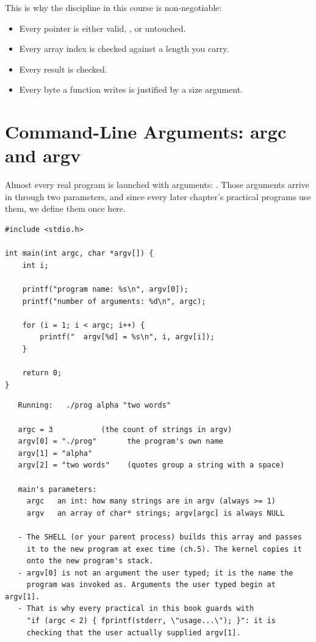 This is why the discipline in this course is non-negotiable:

\begin{itemize}
  \item Every pointer is either valid, , or untouched.
  \item Every array index is checked against a length you carry.
  \item Every  result is checked.
  \item Every byte a function writes is justified by a size argument.
\end{itemize}

\section{Command-Line Arguments: argc and argv}

Almost every real program is launched with arguments: . Those arguments arrive in  through two
parameters, and since every later chapter's practical programs use
them, we define them once here.

\begin{lstlisting}[caption={main receives its command line as argc and argv.}]
#include <stdio.h>

int main(int argc, char *argv[]) {
    int i;

    printf("program name: %s\n", argv[0]);
    printf("number of arguments: %d\n", argc);

    for (i = 1; i < argc; i++) {
        printf("  argv[%d] = %s\n", i, argv[i]);
    }

    return 0;
}
\end{lstlisting}

\begin{verbatim}
   Running:   ./prog alpha "two words"

   argc = 3           (the count of strings in argv)
   argv[0] = "./prog"       the program's own name
   argv[1] = "alpha"
   argv[2] = "two words"    (quotes group a string with a space)

   main's parameters:
     argc   an int: how many strings are in argv (always >= 1)
     argv   an array of char* strings; argv[argc] is always NULL

   - The SHELL (or your parent process) builds this array and passes
     it to the new program at exec time (ch.5). The kernel copies it
     onto the new program's stack.
   - argv[0] is not an argument the user typed; it is the name the
     program was invoked as. Arguments the user typed begin at argv[1].
   - That is why every practical in this book guards with
     "if (argc < 2) { fprintf(stderr, \"usage...\"); }": it is
     checking that the user actually supplied argv[1].
\end{verbatim}

